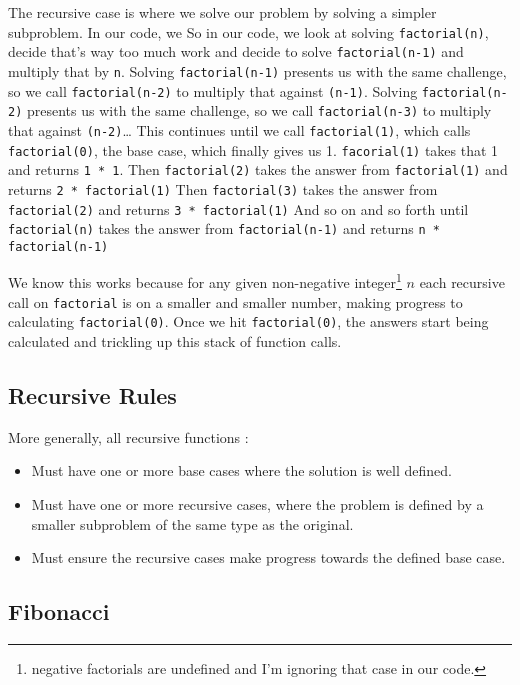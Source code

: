 The recursive case is where we solve our problem by solving a simpler subproblem.
In our code, we
So in our code, we look at solving \texttt{factorial(n)}, decide that's way too much work and decide to solve \texttt{factorial(n-1)} and multiply that by \texttt{n}.
Solving \texttt{factorial(n-1)} presents us with the same challenge, so we call \texttt{factorial(n-2)} to multiply that against \texttt{(n-1)}.  
Solving \texttt{factorial(n-2)} presents us with the same challenge, so we call \texttt{factorial(n-3)} to multiply that against \texttt{(n-2)}\dots  
This continues until we call \texttt{factorial(1)}, which calls \texttt{factorial(0)}, the base case, which finally gives us 1.  \texttt{facorial(1)} takes that 1 and returns \texttt{1 * 1}. 
Then \texttt{factorial(2)} takes the answer from \texttt{factorial(1)} and returns \texttt{2 * \texttt{factorial(1)}}
Then \texttt{factorial(3)} takes the answer from \texttt{factorial(2)} and returns \texttt{3 * \texttt{factorial(1)}}
And so on and so forth until \texttt{factorial(n)} takes the answer from \texttt{factorial(n-1)} and returns \texttt{n * \texttt{factorial(n-1)}}

We know this works because for any given non-negative integer\footnote{negative factorials are undefined and I'm ignoring that case in our code.} $n$  each recursive call on \texttt{factorial} is on a smaller and smaller number, making progress to calculating \texttt{factorial(0)}. Once we hit \texttt{factorial(0)}, the answers start being calculated and trickling up this stack of function calls.

\subsection{Recursive Rules}

More generally, all recursive functions :
\begin{itemize}
	\item Must have one or more base cases where the solution is well defined.
	\item Must have one or more recursive cases, where the problem is defined by a smaller subproblem of the same type as the original.
	\item Must ensure the recursive cases make progress towards the defined base case.
\end{itemize}

\subsection{Fibonacci}





